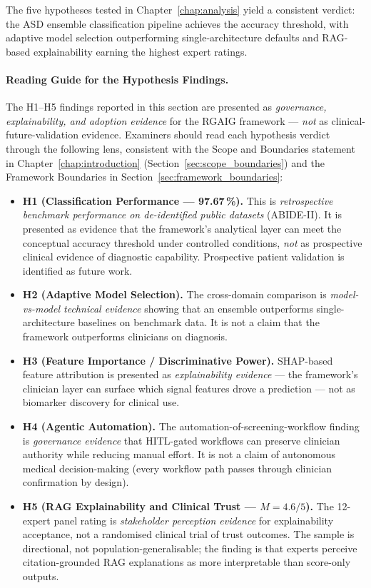 \noindent The five hypotheses tested in Chapter~\ref{chap:analysis} yield a consistent verdict: the ASD ensemble classification pipeline achieves the accuracy threshold, with adaptive model selection outperforming single-architecture defaults and RAG-based explainability earning the highest expert ratings.
\label{sec:ch5_h1}
\label{sec:ch5_h5}

\paragraph{Reading Guide for the Hypothesis Findings.}
\label{para:ch5_findings_reading_guide}
The H1--H5 findings reported in this section are presented as \textit{governance, explainability, and adoption evidence} for the RGAIG framework --- \emph{not} as clinical-future-validation evidence. Examiners should read each hypothesis verdict through the following lens, consistent with the Scope and Boundaries statement in Chapter~\ref{chap:introduction} (Section~\ref{sec:scope_boundaries}) and the Framework Boundaries in Section~\ref{sec:framework_boundaries}:
\begin{itemize}[leftmargin=*, itemsep=3pt]
    \item \textbf{H1 (Classification Performance --- 97.67\,\%).} This is \emph{retrospective benchmark performance on de-identified public datasets} (ABIDE-II). It is presented as evidence that the framework's analytical layer can meet the conceptual accuracy threshold under controlled conditions, \emph{not} as prospective clinical evidence of diagnostic capability. Prospective patient validation is identified as future work.
    \item \textbf{H2 (Adaptive Model Selection).} The cross-domain comparison is \emph{model-vs-model technical evidence} showing that an ensemble outperforms single-architecture baselines on benchmark data. It is not a claim that the framework outperforms clinicians on diagnosis.
    \item \textbf{H3 (Feature Importance / Discriminative Power).} SHAP-based feature attribution is presented as \emph{explainability evidence} --- the framework's clinician layer can surface which signal features drove a prediction --- not as biomarker discovery for clinical use.
    \item \textbf{H4 (Agentic Automation).} The automation-of-screening-workflow finding is \emph{governance evidence} that HITL-gated workflows can preserve clinician authority while reducing manual effort. It is not a claim of autonomous medical decision-making (every workflow path passes through clinician confirmation by design).
    \item \textbf{H5 (RAG Explainability and Clinical Trust --- $M=4.6/5$).} The 12-expert panel rating is \emph{stakeholder perception evidence} for explainability acceptance, not a randomised clinical trial of trust outcomes. The sample is directional, not population-generalisable; the finding is that experts perceive citation-grounded RAG explanations as more interpretable than score-only outputs.
\end{itemize}
